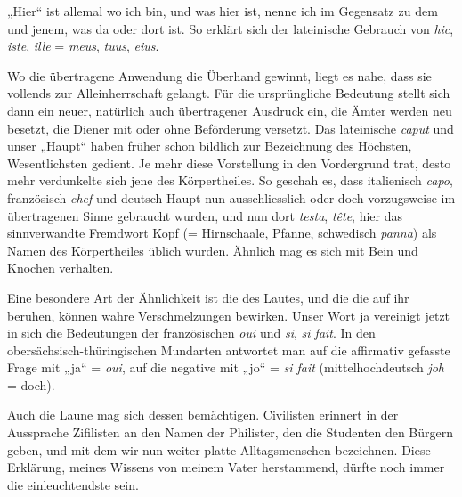 {„Hier“ ist allemal wo ich bin, und was hier ist, nenne ich  im Gegensatz zu dem und jenem, was da oder dort ist. So erklärt sich \label{fp.231} der lateinische Gebrauch von \textit{hic}, \textit{iste}, \textit{ille} = \textit{meus}, \textit{tuus}, \textit{eius}. 

Wo die übertragene Anwendung die Überhand gewinnt, liegt es nahe, dass sie vollends zur Alleinherrschaft gelangt. Für die ursprüngliche Bedeutung stellt sich dann ein neuer, natürlich auch übertragener Ausdruck ein, die Ämter werden neu besetzt, die Diener mit oder ohne Beförderung versetzt. Das lateinische \textit{caput} und unser „Haupt“ haben früher schon bildlich zur Bezeichnung des Höchsten, Wesentlichsten gedient. Je mehr diese Vorstellung in den Vordergrund trat, desto mehr verdunkelte sich jene des Körpertheiles. So geschah es, dass italienisch \textit{capo}, französisch \textit{chef} und deutsch Haupt nun ausschliesslich oder doch vorzugsweise im übertragenen Sinne gebraucht wurden, und nun dort \textit{testa}, \textit{tête}, hier das sinnverwandte Fremdwort Kopf (= Hirnschaale, Pfanne, schwedisch \textit{panna}) als Namen des Körpertheiles üblich wurden. Ähnlich mag es sich mit Bein und Knochen verhalten.

Eine besondere Art der Ähnlichkeit ist die des Lautes, und die  die auf ihr beruhen, können wahre Verschmelzungen bewirken. Unser Wort ja vereinigt jetzt in sich die Bedeutungen der französischen \textit{oui} und \textit{si}, \textit{si fait}. In den obersächsisch-thüringischen Mundarten antwortet man auf die affirmativ gefasste Frage mit „ja“ = \textit{oui}, auf die negative mit „jo“ = \textit{si fait} (mittelhochdeutsch \textit{joh} = doch). 

Auch die Laune mag sich dessen bemächtigen. Civilisten erinnert in der Aussprache Zifilisten an den Namen der Philister, den die Studenten den Bürgern geben, und mit dem wir nun weiter platte Alltagsmenschen bezeichnen. Diese Erklärung, meines Wissens von meinem Vater herstammend, dürfte noch immer die einleuchtendste sein.

}
